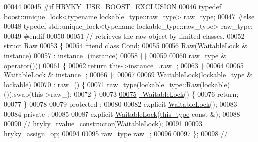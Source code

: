 \begin{DoxyCode}
00044 
00045 \textcolor{preprocessor}{#if HRYKY\_USE\_BOOST\_EXCLUSION}
00046 \textcolor{preprocessor}{}    \textcolor{keyword}{typedef} boost::unique\_lock<typename lockable\_type::raw\_type> raw\_type;
00047 \textcolor{preprocessor}{#else}
00048 \textcolor{preprocessor}{}    \textcolor{keyword}{typedef} std::unique\_lock<typename lockable\_type::raw\_type> raw\_type;
00049 \textcolor{preprocessor}{#endif}
00050 \textcolor{preprocessor}{}
00051     \textcolor{comment}{// retrieves the raw object by limited classes.}
00052     \textcolor{keyword}{struct }Raw
00053     \{
00054         \textcolor{keyword}{friend} \textcolor{keyword}{class }\hyperlink{classhryky_1_1exclusion_1_1_cond}{Cond};
00055         
00056         Raw(\hyperlink{classhryky_1_1exclusion_1_1_waitable_lock}{WaitableLock} & instance)
00057             : instance\_(instance)
00058         \{\}
00059         
00060         raw\_type & operator()()
00061         \{
00062             \textcolor{keywordflow}{return} this->instance\_.raw\_;
00063         \}
00064         
00065         \hyperlink{classhryky_1_1exclusion_1_1_waitable_lock}{WaitableLock} & instance\_;
00066     \};
00067 
\hypertarget{exclusion__waitable__lock_8h_source_l00069}{}\hyperlink{classhryky_1_1exclusion_1_1_waitable_lock_a57940b01639eedd771e6eabc709c633c}{00069}     \hyperlink{classhryky_1_1exclusion_1_1_waitable_lock_a19be1a19921bc2a0cab7e4b9334fa838}{WaitableLock}(lockable\_type & lockable)
00070         : raw\_() \{
00071         raw\_type(lockable\_type::Raw(lockable)()).swap(this->raw\_);
00072     \}
00073 
\hypertarget{exclusion__waitable__lock_8h_source_l00075}{}\hyperlink{classhryky_1_1exclusion_1_1_waitable_lock_ab2038d9f27a781b2f3255fed935100f7}{00075}     \hyperlink{classhryky_1_1exclusion_1_1_waitable_lock_ab2038d9f27a781b2f3255fed935100f7}{~WaitableLock}() \{
00076         \textcolor{keywordflow}{return};
00077     \}
00078 
00079 \textcolor{keyword}{protected} :
00080 
00082     \textcolor{keyword}{explicit} \hyperlink{classhryky_1_1exclusion_1_1_waitable_lock_a19be1a19921bc2a0cab7e4b9334fa838}{WaitableLock}();
00083 
00084 \textcolor{keyword}{private} :
00085 
00087     \textcolor{keyword}{explicit} \hyperlink{classhryky_1_1exclusion_1_1_waitable_lock_a19be1a19921bc2a0cab7e4b9334fa838}{WaitableLock}(\hyperlink{classhryky_1_1exclusion_1_1_waitable_lock_ac04c20cbf4a51c9dac3ae485ff40c723}{this_type} \textcolor{keyword}{const} &);
00088 
00090     \textcolor{comment}{// hryky\_rvalue\_constructor(WaitableLock);}
00091 
00093     hryky\_assign\_op;
00094 
00095     raw\_type    raw\_;
00096 
00097 \};
00098 \textcolor{comment}{//
}
\end{DoxyCode}
